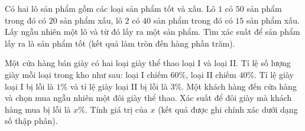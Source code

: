 \begin{bt}%
	Có hai lô sản phẩm gồm các loại sản phẩm tốt và xấu. Lô $1$ có $50$ sản phẩm trong đó có $20$ sản phẩm xấu, lô $2$ có $40$ sản phẩm trong đó có $15$ sản phẩm xấu. Lấy ngẫu nhiên một lô và từ đó lấy ra một sản phẩm. Tìm xác suất để sản phẩm lấy ra là sản phẩm tốt (kết quả làm tròn đến hàng  phần trăm).
\end{bt}

\begin{bt}%
	Một cửa hàng bán giày có hai loại  giày thể thao loại I và loại II. Tỉ lệ số lượng giày mỗi loại trong kho như sau: loại I chiếm $60\%$, loại II chiếm $40\%$. Tỉ lệ giày loại I bị lỗi là $1\%$ và tỉ lệ giày loại II bị lỗi là $3\%$. Một khách hàng đến cửa hàng và chọn mua ngẫu nhiên một đôi giày thể thao. Xác suất để đôi giày mà khách hàng mua bị lỗi là $x\%$. Tính giá trị của $x$ (kết quả được ghi chính xác dưới dạng số thập phân).
\end{bt}

